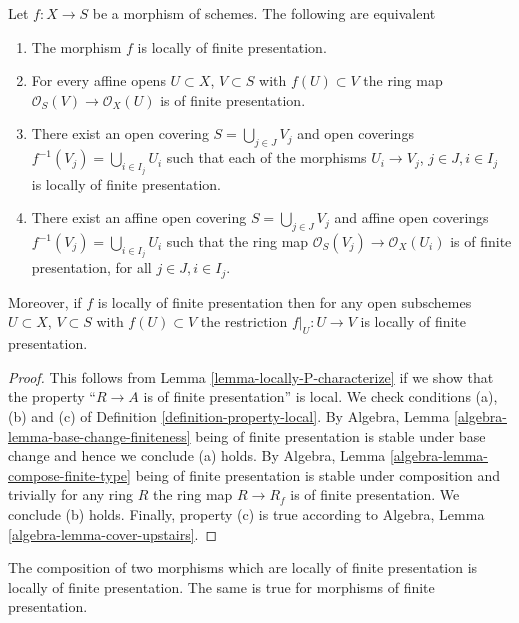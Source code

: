 \begin{lemma}
\label{lemma-locally-finite-presentation-characterize}
Let $f : X \to S$ be a morphism of schemes.
The following are equivalent
\begin{enumerate}
\item The morphism $f$ is locally of finite presentation.
\item For every affine opens $U \subset X$, $V \subset S$
with $f(U) \subset V$ the ring map
$\mathcal{O}_S(V) \to \mathcal{O}_X(U)$ is of finite presentation.
\item There exist an open covering $S = \bigcup_{j \in J} V_j$
and open coverings $f^{-1}(V_j) = \bigcup_{i \in I_j} U_i$ such
that each of the morphisms $U_i \to V_j$, $j\in J, i\in I_j$
is locally of finite presentation.
\item There exist an affine open covering $S = \bigcup_{j \in J} V_j$
and affine open coverings $f^{-1}(V_j) = \bigcup_{i \in I_j} U_i$ such
that the ring map $\mathcal{O}_S(V_j) \to \mathcal{O}_X(U_i)$ is
of finite presentation, for all $j\in J, i\in I_j$.
\end{enumerate}
Moreover, if $f$ is locally of finite presentation then for
any open subschemes $U \subset X$, $V \subset S$ with $f(U) \subset V$
the restriction $f|_U : U \to V$ is locally of finite presentation.
\end{lemma}

\begin{proof}
This follows from Lemma \ref{lemma-locally-P-characterize} if we show that
the property ``$R \to A$ is of finite presentation'' is local.
We check conditions (a), (b) and (c) of Definition
\ref{definition-property-local}.
By Algebra, Lemma \ref{algebra-lemma-base-change-finiteness}
being of finite presentation is stable under base change and hence
we conclude (a) holds. By Algebra, Lemma
\ref{algebra-lemma-compose-finite-type} being of finite presentation
is stable under composition and trivially for any ring
$R$ the ring map $R \to R_f$ is of finite presentation.
We conclude (b) holds. Finally, property (c) is true
according to Algebra, Lemma \ref{algebra-lemma-cover-upstairs}.
\end{proof}

\begin{lemma}
\label{lemma-composition-finite-presentation}
The composition of two morphisms which are locally of finite presentation is
locally of finite presentation.
The same is true for morphisms of finite presentation.
\end{lemma}

